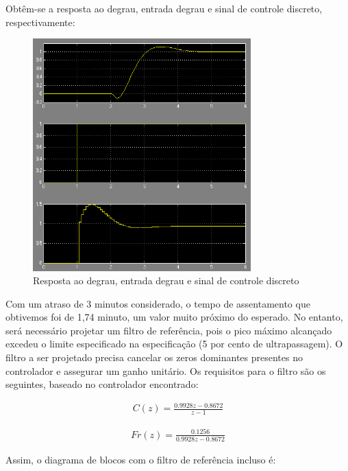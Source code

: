 \documentclass[a4paper,12pt]{article}
\begin{document}
  Obtêm-se a resposta ao degrau, entrada degrau e sinal de controle discreto, respectivamente:

   \begin{figure}[H]
  \centering
  \includegraphics[width=0.75\textwidth]{Imagens/q12.png}
  \caption{Resposta ao degrau, entrada degrau e sinal de controle discreto}
  \end{figure}

  Com um atraso de 3 minutos considerado, o tempo de assentamento que obtivemos foi de 1,74 minuto, um valor muito próximo do esperado. No entanto, será necessário projetar um filtro de referência, pois o pico máximo alcançado excedeu o limite especificado na especificação (5 por cento de ultrapassagem). O filtro a ser projetado precisa cancelar os zeros dominantes presentes no controlador e assegurar um ganho unitário. Os requisitos para o filtro são os seguintes, baseado no controlador encontrado:

  \begin{align}
      C(z) = \frac{0.9928z -0.8672}{z-1}
  \end{align}

   \begin{align}
      Fr(z) = \frac{0.1256}{0.9928z-0.8672}
  \end{align}

  Assim, o diagrama de blocos com o filtro de referência incluso é:
\end{document}
